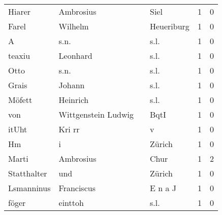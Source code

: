 \begin{tabular}{llllrr}
                   Hiarer &                          Ambrosius &             &                                        Siel &          1 &         0 \\
                    Farel &                            Wilhelm &             &                                  Heueriburg &          1 &         0 \\
                        A &                               s.n. &             &                                        s.l. &          1 &         0 \\
                   teaxiu &                           Leonhard &             &                                        s.l. &          1 &         0 \\
                     Otto &                               s.n. &             &                                        s.l. &          1 &         0 \\
                    Grais &                             Johann &             &                                        s.l. &          1 &         0 \\
                   Möfett &                           Heinrich &             &                                        s.l. &          1 &         0 \\
                      von &                Wittgenstein Ludwig &             &                                        BqtI &          1 &         0 \\
                    itUht &                             Kri rr &             &                                           v &          1 &         0 \\
                       Hm &                                  i &             &                                      Zürich &          1 &         0 \\
                    Marti &                          Ambrosius &             &                                        Chur &          1 &         2 \\
              Statthalter &                                und &             &                                      Zürich &          1 &         0 \\
               Lsmanninus &                         Franciscus &             &                                     E n a J &          1 &         0 \\
                    föger &                            einttoh &             &                                        s.l. &          1 &         0 \\

\end{tabular}
